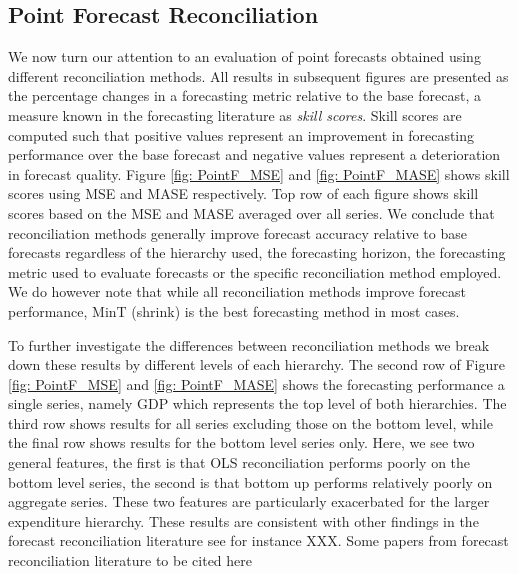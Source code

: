 \documentclass[graybox]{svmult}
\begin{document}
\subsection{Point Forecast Reconciliation}


We now turn our attention to an evaluation of point forecasts obtained using different reconciliation methods.  All results in subsequent figures are presented as the percentage changes in a forecasting metric relative to the base forecast, a measure known in the forecasting literature as {\em skill scores}.  Skill scores are computed such that positive values represent an improvement in forecasting performance over the base forecast and negative values represent a deterioration in forecast quality. Figure \ref{fig: PointF_MSE} and \ref{fig: PointF_MASE} shows skill scores using MSE and MASE respectively. Top row of each figure shows skill scores based on the MSE and MASE averaged over all series.  We conclude that reconciliation methods generally improve forecast accuracy relative to base forecasts regardless of the hierarchy used, the forecasting horizon, the forecasting metric used to evaluate forecasts or the specific reconciliation method employed.  We do however note that while all reconciliation methods improve forecast performance, MinT (shrink) is the best forecasting method in most cases.

To further investigate the differences between reconciliation methods we break down these results by different levels of each hierarchy. The second row of Figure \ref{fig: PointF_MSE} and \ref{fig: PointF_MASE} shows the forecasting performance a single series, namely GDP which represents the top level of both hierarchies.  The third row shows results for all series excluding those on the bottom level, while the final row shows results for the bottom level series only.  Here, we see two general features, the first is that OLS reconciliation performs poorly on the bottom level series, the second is that bottom up performs relatively poorly on aggregate series.  These two features are particularly exacerbated for the larger expenditure hierarchy.  These results are consistent with other findings in the forecast reconciliation literature see for instance XXX. {\color{red} Some papers from forecast reconciliation literature to be cited here}
\end{document}

